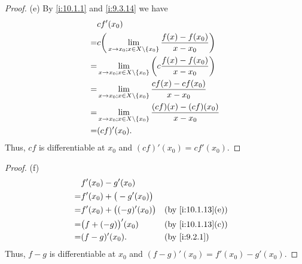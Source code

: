\begin{proof}{(e)}
  By \cref{i:10.1.1} and \cref{i:9.3.14} we have
  \begin{align*}
      & cf'(x_0)                                                                                    \\
    = & c \bigg(\lim_{x \to x_0 ; x \in X \setminus \left\lbrace x_0\right\rbrace} \dfrac{f(x) - f(x_0)}{x - x_0}\bigg) \\
    = & \lim_{x \to x_0 ; x \in X \setminus \left\lbrace x_0\right\rbrace} \bigg(c \dfrac{f(x) - f(x_0)}{x - x_0}\bigg) \\
    = & \lim_{x \to x_0 ; x \in X \setminus \left\lbrace x_0\right\rbrace} \dfrac{cf(x) - cf(x_0)}{x - x_0}             \\
    = & \lim_{x \to x_0 ; x \in X \setminus \left\lbrace x_0\right\rbrace} \dfrac{(cf)(x) - (cf)(x_0)}{x - x_0}         \\
    = & (cf)'(x_0).
  \end{align*}
  Thus, \(cf\) is differentiable at \(x_0\) and \((cf)'(x_0) = cf'(x_0)\).
\end{proof}

\begin{proof}{(f)}
  \begin{align*}
      & f'(x_0) - g'(x_0)                                     \\
    = & f'(x_0) + \big(-g'(x_0)\big)                          \\
    = & f'(x_0) + \big((-g)'(x_0)\big) &  & \by{i:10.1.13}[e] \\
    = & \big(f + (-g)\big)'(x_0)       &  & \by{i:10.1.13}[c] \\
    = & (f - g)'(x_0).                 &  & \by{i:9.2.1}
  \end{align*}
  Thus, \(f - g\) is differentiable at \(x_0\) and \((f - g)'(x_0) = f'(x_0) - g'(x_0)\).
\end{proof}

